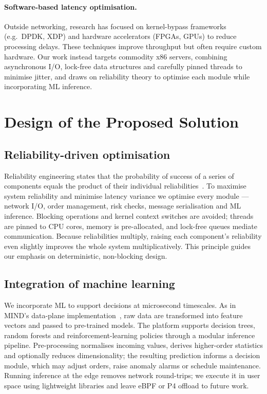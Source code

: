 \documentclass[10pt,a4paper,twocolumn]{article}
\begin{document}
\paragraph{Software-based latency optimisation.}
Outside networking, research has focused on kernel-bypass frameworks (e.g.\ DPDK, XDP) and
hardware accelerators (FPGAs, GPUs) to reduce processing delays. These techniques improve
throughput but often require custom hardware. Our work instead targets commodity x86
servers, combining asynchronous I/O, lock-free data structures and carefully pinned threads
to minimise jitter, and draws on reliability theory to optimise each module while
incorporating ML inference.

\section{Design of the Proposed Solution}\label{sec:design}
\subsection{Reliability-driven optimisation}
Reliability engineering states that the probability of success of a series of components
equals the product of their individual reliabilities~\cite{reliability}. To maximise system
reliability and minimise latency variance we optimise every module --- network I/O, order
management, risk checks, message serialisation and ML inference. Blocking operations and
kernel context switches are avoided; threads are pinned to CPU cores, memory is
pre-allocated, and lock-free queues mediate communication. Because reliabilities multiply,
raising each component's reliability even slightly improves the whole system
multiplicatively. This principle guides our emphasis on deterministic, non-blocking design.

\subsection{Integration of machine learning}
We incorporate ML to support decisions at microsecond timescales. As in MIND's data-plane
implementation~\cite{mind}, raw data are transformed into feature vectors and passed to
pre-trained models. The platform supports decision trees, random forests and
reinforcement-learning policies through a modular inference pipeline. Pre-processing
normalises incoming values, derives higher-order statistics and optionally reduces
dimensionality; the resulting prediction informs a decision module, which may adjust
orders, raise anomaly alarms or schedule maintenance. Running inference at the edge removes
network round-trips; we execute it in user space using lightweight libraries and leave eBPF
or P4 offload to future work.
\end{document}
